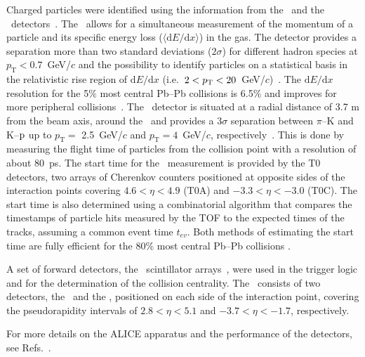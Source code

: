 Charged particles were identified using the information from the \TPC~and the \TOF~detectors~\cite{Aamodt:2008zz}. The \TPC~allows for a simultaneous measurement of the momentum of a particle and its specific energy loss ($\langle \mathrm{d}E/\mathrm{d}x \rangle$) in the gas. The detector provides a separation more than two standard deviations ($2\sigma$) for different hadron species at $p_{\mathrm{T}} < 0.7$~GeV/$c$ and the possibility to identify particles on a statistical basis in the relativistic rise region of $\mathrm{d}E/\mathrm{d}x$ (i.e.~$2 < p_{\rm{T}} < 20$~GeV/$c$)~\cite{Abelev:2014ffa}. The $\mathrm{d}E/\mathrm{d}x$ resolution for the 5$\%$ most central Pb--Pb collisions is 6.5$\%$ and improves for more peripheral collisions~\cite{Abelev:2014ffa}. The \TOF~detector is situated at a radial distance of 3.7 m from the beam axis, around the \TPC~and provides a $3\sigma$ separation between $\pi$--K and K--$\rm{p}$ up to $p_{\mathrm{T}} = $ 2.5~GeV/$c$ and $p_{\mathrm{T}} = 4$~GeV/$c$, respectively~\cite{Abelev:2014ffa}. This is done by measuring the flight time of particles from the collision point with a resolution of about $80$~ps. The start time for the \TOF~measurement is provided by the T0 detectors, two arrays of Cherenkov counters positioned at opposite sides of the interaction points covering $4.6 < \eta < 4.9$ (T0A) and $-3.3 < \eta < -3.0$ (T0C). The start time is also determined using a combinatorial algorithm that compares the timestamps of particle hits measured by the TOF to the expected times of the tracks, assuming a common event time $t_{ev}$. Both methods of estimating the start time are fully efficient for the 80\% most central Pb--Pb collisions \cite{Abelev:2014ffa}.

A set of forward detectors, the \VZERO~scintillator arrays~\cite{Abbas:2013taa}, were used in the trigger logic and for the determination of the collision centrality. The \VZERO~consists of two detectors, the \VZEROA~and the \VZEROC, positioned on each side of the interaction point, covering the pseudorapidity intervals of $2.8 < \eta < 5.1$ and $-3.7 < \eta < -1.7$, respectively. 

For more details on the ALICE apparatus and the performance of the detectors, see Refs.~\cite{Aamodt:2008zz,Abelev:2014ffa}.
